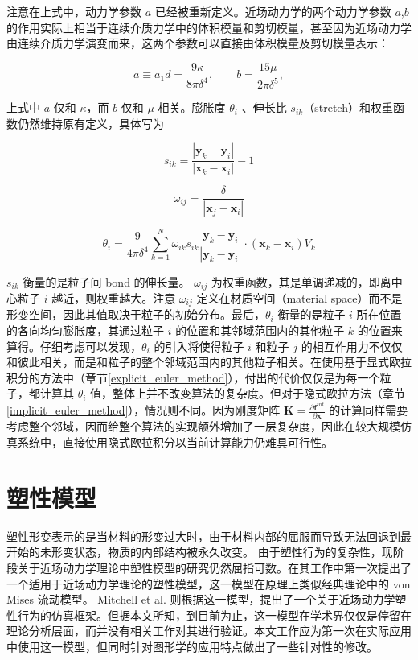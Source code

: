 注意在上式中，动力学参数 $a$ 已经被重新定义。近场动力学的两个动力学参数 $a$,$b$ 的作用实际上相当于连续介质力学中的体积模量和剪切模量，甚至因为近场动力学由连续介质力学演变而来，这两个参数可以直接由体积模量及剪切模量表示：

\begin{equation}
a \equiv a_1d = \frac{9\kappa}{8\pi\delta^4} ,\qquad b = \frac{15\mu}{2\pi\delta^5},
\end{equation}

上式中 $a$ 仅和 $\kappa$，而 $b$ 仅和 $\mu$ 相关。膨胀度 $\theta_i$ 、伸长比 $s_{ik}$（stretch）和权重函数仍然维持原有定义，具体写为

\begin{equation}
s_{ik}=\frac{|\mathbf{y}_k-\mathbf{y}_i|}{|\mathbf{x}_k-\mathbf{x}_i|} -1
\end{equation}

\begin{equation}
\omega_{ij} = \frac{\delta}{|\mathbf{x}_j-\mathbf{x}_i|}
\end{equation}

\begin{equation}
\theta_i = \frac{9}{4\pi\delta^4}\sum_{k=1}^N\omega_{ik}s_{ik}\frac{\mathbf{y}_k-\mathbf{y}_i}{|\mathbf{y}_k-\mathbf{y}_i|}\cdot(\mathbf{x}_k-\mathbf{x}_i)V_k
\end{equation}

$s_{ik}$ 衡量的是粒子间 bond 的伸长量。 $\omega_{ij}$ 为权重函数，其是单调递减的，即离中心粒子 $i$ 越近，则权重越大。注意 $\omega_{ij}$ 定义在材质空间（material space）而不是形变空间，因此其值取决于粒子的初始分布。最后，$\theta_i$ 衡量的是粒子 $i$ 所在位置的各向均匀膨胀度，其通过粒子 $i$ 的位置和其邻域范围内的其他粒子 $k$ 的位置来算得。仔细考虑可以发现，$\theta_i$ 的引入将使得粒子 $i$ 和粒子 $j$ 的相互作用力不仅仅和彼此相关，而是和粒子的整个邻域范围内的其他粒子相关。在使用基于显式欧拉积分的方法中（章节\ref{explicit_euler_method}），付出的代价仅仅是为每一个粒子，都计算其 $\theta_i$ 值，整体上并不改变算法的复杂度。但对于隐式欧拉方法（章节\ref{implicit_euler_method}），情况则不同。因为刚度矩阵 $\textbf{K} = \frac{\partial \textbf{f}^{int}}{\partial \textbf{x}}$ 的计算同样需要考虑整个邻域，因而给整个算法的实现额外增加了一层复杂度，因此在较大规模仿真系统中，直接使用隐式欧拉积分以当前计算能力仍难具可行性。

\section{塑性模型}
塑性形变表示的是当材料的形变过大时，由于材料内部的屈服而导致无法回退到最开始的未形变状态，物质的内部结构被永久改变。
由于塑性行为的复杂性，现阶段关于近场动力学理论中塑性模型的研究仍然屈指可数。在其工作中第一次提出了一个适用于近场动力学理论的塑性模型，这一模型在原理上类似经典理论中的 von Mises 流动模型。 Mitchell et al. 则根据这一模型，提出了一个关于近场动力学塑性行为的仿真框架。但据本文所知，到目前为止，这一模型在学术界仅仅是停留在理论分析层面，而并没有相关工作对其进行验证。本文工作应为第一次在实际应用中使用这一模型，但同时针对图形学的应用特点做出了一些针对性的修改。

